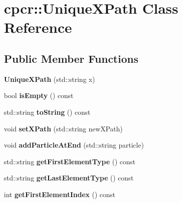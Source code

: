 \hypertarget{classcpcr_1_1UniqueXPath}{\section{cpcr\-:\-:Unique\-X\-Path Class Reference}
\label{classcpcr_1_1UniqueXPath}
}
\subsection*{Public Member Functions}
\begin{DoxyCompactItemize}
\item 
\hypertarget{classcpcr_1_1UniqueXPath_a486e85db63833a0ca1891a3ad5b3ed69}{{\bfseries Unique\-X\-Path} (std\-::string x)}\label{classcpcr_1_1UniqueXPath_a486e85db63833a0ca1891a3ad5b3ed69}

\item 
\hypertarget{classcpcr_1_1UniqueXPath_ae89e000a7b5f95547ca6ad0c94ef442c}{bool {\bfseries is\-Empty} () const }\label{classcpcr_1_1UniqueXPath_ae89e000a7b5f95547ca6ad0c94ef442c}

\item 
\hypertarget{classcpcr_1_1UniqueXPath_a372eb1a34a1f8404eab45bc528e6bf52}{std\-::string {\bfseries to\-String} () const }\label{classcpcr_1_1UniqueXPath_a372eb1a34a1f8404eab45bc528e6bf52}

\item 
\hypertarget{classcpcr_1_1UniqueXPath_a7951602556af4adf8d92b03366b4061a}{void {\bfseries set\-X\-Path} (std\-::string new\-X\-Path)}\label{classcpcr_1_1UniqueXPath_a7951602556af4adf8d92b03366b4061a}

\item 
\hypertarget{classcpcr_1_1UniqueXPath_a4e2ebbcb2a962d01bf59fdb6f7bfed70}{void {\bfseries add\-Particle\-At\-End} (std\-::string particle)}\label{classcpcr_1_1UniqueXPath_a4e2ebbcb2a962d01bf59fdb6f7bfed70}

\item 
\hypertarget{classcpcr_1_1UniqueXPath_aebba576085cd3bc1675a6be8b2b1f189}{std\-::string {\bfseries get\-First\-Element\-Type} () const }\label{classcpcr_1_1UniqueXPath_aebba576085cd3bc1675a6be8b2b1f189}

\item 
\hypertarget{classcpcr_1_1UniqueXPath_ae17acff34b7cad0ac44b645ceeef7152}{std\-::string {\bfseries get\-Last\-Element\-Type} () const }\label{classcpcr_1_1UniqueXPath_ae17acff34b7cad0ac44b645ceeef7152}

\item 
\hypertarget{classcpcr_1_1UniqueXPath_a020206007546296ec095c5d28f482331}{int {\bfseries get\-First\-Element\-Index} () const }\label{classcpcr_1_1UniqueXPath_a020206007546296ec095c5d28f482331}


\end{DoxyCompactItemize}
